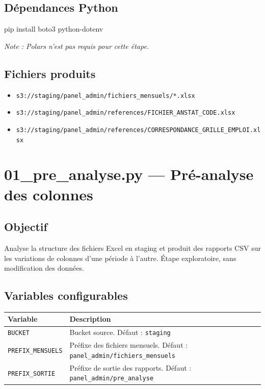 \documentclass[12pt,a4paper,french]{report}
\newcommand{\bucket}[1]{\texttt{s3://#1}}
\begin{document}
\subsection{Dépendances Python}

\begin{codebox}[]
pip install boto3 python-dotenv
\end{codebox}

\textit{Note : Polars n'est pas requis pour cette étape.}

\subsection{Fichiers produits}

\begin{itemize}[nosep]
  \item \bucket{staging/panel\_admin/fichiers\_mensuels/*.xlsx}
  \item \bucket{staging/panel\_admin/references/FICHIER\_ANSTAT\_CODE.xlsx}
  \item \bucket{staging/panel\_admin/references/CORRESPONDANCE\_GRILLE\_EMPLOI.xlsx}
\end{itemize}

\section{01\_pre\_analyse.py — Pré-analyse des colonnes}

\subsection{Objectif}

Analyse la structure des fichiers Excel en staging et produit des rapports
CSV sur les variations de colonnes d'une période à l'autre. Étape exploratoire,
sans modification des données.

\subsection{Variables configurables}

\begin{tabularx}{\textwidth}{lX}
  \toprule
  \textbf{Variable} & \textbf{Description} \\
  \midrule
  \texttt{BUCKET} & Bucket source. Défaut : \texttt{staging} \\
  \texttt{PREFIX\_MENSUELS} & Préfixe des fichiers mensuels.
    Défaut : \texttt{panel\_admin/fichiers\_mensuels} \\
  \texttt{PREFIX\_SORTIE} & Préfixe de sortie des rapports.
    Défaut : \texttt{panel\_admin/pre\_analyse} \\
  \bottomrule
\end{tabularx}
\end{document}
